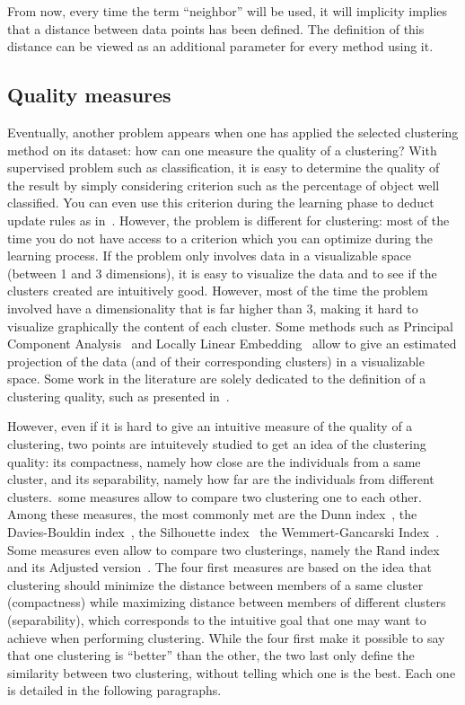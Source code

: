     From now, every time the term ``neighbor'' will be used, it will implicity implies that a distance between data points has been defined. The definition of this distance can be viewed as an additional parameter for every method using it.

    \subsection{Quality measures}
\label{sec:quality_measures}
    Eventually, another problem appears when one has applied the selected clustering method on its dataset: how can one measure the quality of a clustering? With supervised problem such as classification, it is easy to determine the quality of the result by simply considering criterion such as the percentage of object well classified. You can even use this criterion during the learning phase to deduct update rules as in~\cite{vincent2010stacked}. However, the problem is different for clustering: most of the time you do not have access to a criterion which you can optimize during the learning process. If the problem only involves data in a visualizable space (between 1 and 3 dimensions), it is easy to visualize the data and to see if the clusters created are intuitively good. However, most of the time the problem involved have a dimensionality that is far higher than 3, making it hard to visualize graphically the content of each cluster. Some methods such as Principal Component Analysis~\cite{wold1987principal} and Locally Linear Embedding~\cite{roweis2000nonlinear} allow to give an estimated projection of the data (and of their corresponding clusters) in a visualizable space. Some work in the literature are solely dedicated to the definition of a clustering quality, such as presented in~\cite{ben2009measures}.

    However, even if it is hard to give an intuitive measure of the quality of a clustering, two points are intuitevely studied to get an idea of the clustering quality: its compactness, namely how close are the individuals from a same cluster, and its separability, namely how far are the individuals from different clusters.\ some measures allow to compare two clustering one to each other. Among these measures, the most commonly met are the Dunn index~\cite{dunn1973fuzzy}, the Davies-Bouldin index~\cite{davies1979cluster}, the Silhouette index~\cite{rousseeuw1987silhouettes} the Wemmert-Gancarski Index~\cite{wemmert2000classification}. Some measures even allow to compare two clusterings, namely the Rand index~\cite{rand1971objective} and its Adjusted version~\cite{hubert1985comparing}. The four first measures are based on the idea that clustering should minimize the distance between members of a same cluster (compactness) while maximizing distance between members of different clusters (separability), which corresponds to the intuitive goal that one may want to achieve when performing clustering.  While the four first make it possible to say that one clustering is ``better'' than the other, the two last only define the similarity between two clustering, without telling which one is the best. Each one is detailed in the following paragraphs.

